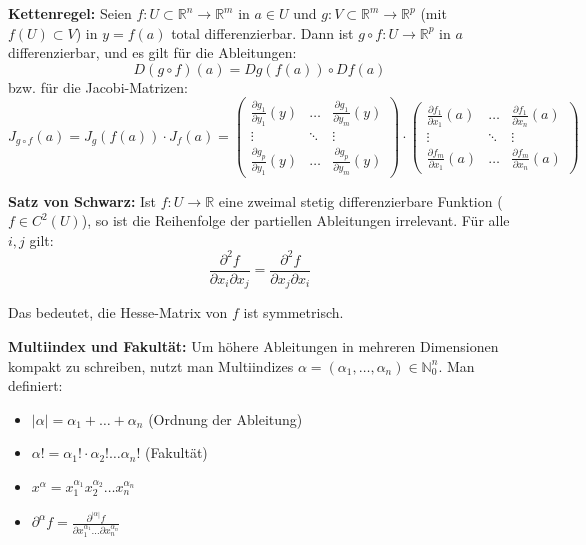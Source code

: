 \begin{theorem}
    \textbf{Kettenregel:} Seien $f: U \subset \mathbb{R}^n \to \mathbb{R}^m$ in $a \in U$ und $g: V \subset \mathbb{R}^m \to \mathbb{R}^p$ (mit $f(U) \subset V$) in $y = f(a)$ total differenzierbar. Dann ist $g \circ f: U \to \mathbb{R}^p$ in $a$ differenzierbar, und es gilt für die Ableitungen:
    $$ D(g \circ f)(a) = Dg(f(a)) \circ Df(a) $$
    bzw. für die Jacobi-Matrizen:
    $$ J_{g \circ f}(a) = J_g(f(a)) \cdot J_f(a) = \begin{pmatrix}
    \frac{\partial g_1}{\partial y_1}(y) & \dots & \frac{\partial g_1}{\partial y_m}(y) \\
    \vdots & \ddots & \vdots \\
    \frac{\partial g_p}{\partial y_1}(y) & \dots & \frac{\partial g_p}{\partial y_m}(y)
    \end{pmatrix} \cdot \begin{pmatrix}
    \frac{\partial f_1}{\partial x_1}(a) & \dots & \frac{\partial f_1}{\partial x_n}(a) \\
    \vdots & \ddots & \vdots \\
    \frac{\partial f_m}{\partial x_1}(a) & \dots & \frac{\partial f_m}{\partial x_n}(a)
    \end{pmatrix} $$
\end{theorem}

\begin{theorem}
    \textbf{Satz von Schwarz:} Ist $f: U \to \mathbb{R}$ eine zweimal stetig differenzierbare Funktion ($f \in C^2(U)$), so ist die Reihenfolge der partiellen Ableitungen irrelevant. Für alle $i, j$ gilt:
    $$ \frac{\partial^2 f}{\partial x_i \partial x_j} = \frac{\partial^2 f}{\partial x_j \partial x_i} $$
\end{theorem}

\begin{remark}
    Das bedeutet, die Hesse-Matrix von $f$ ist symmetrisch.
\end{remark}

\begin{remark}
    \textbf{Multiindex und Fakultät:} Um höhere Ableitungen in mehreren Dimensionen kompakt zu schreiben, nutzt man Multiindizes $\alpha = (\alpha_1, \dots, \alpha_n) \in \mathbb{N}_0^n$.
    Man definiert:
    \begin{itemize}
        \item $|\alpha| = \alpha_1 + \dots + \alpha_n$ (Ordnung der Ableitung)
        \item $\alpha! = \alpha_1! \cdot \alpha_2! \dots \alpha_n!$ (Fakultät)
        \item $x^\alpha = x_1^{\alpha_1} x_2^{\alpha_2} \dots x_n^{\alpha_n}$
        \item $\partial^\alpha f = \frac{\partial^{|\alpha|} f}{\partial x_1^{\alpha_1} \dots \partial x_n^{\alpha_n}}$
    \end{itemize}
\end{remark}

